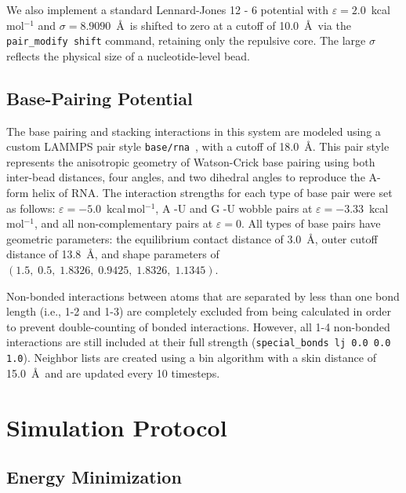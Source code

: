 We also implement a standard Lennard-Jones 12 - 6 potential
with $\varepsilon = 2.0$~kcal\,mol$^{-1}$ and $\sigma = 8.9090$~\AA\
is shifted to zero at a cutoff of 10.0~\AA\ via the
\texttt{pair\_modify shift} command, retaining only the repulsive core.
The large $\sigma$ reflects the physical size of a nucleotide-level bead.

\subsection{Base-Pairing Potential}

The base pairing and stacking interactions in this system are modeled using a custom LAMMPS pair style \texttt{base/rna}~\cite{Aierken2024}, with a cutoff of 18.0~\AA. This pair style represents the anisotropic geometry of Watson-Crick base pairing using both inter-bead distances, four angles, and two dihedral angles to reproduce the A-form helix of RNA. The interaction strengths for each type of base pair were set as follows:
$\varepsilon = -5.0$~kcal\,mol$^{-1}$, A -U and G -U wobble pairs at
$\varepsilon = -3.33$~kcal\,mol$^{-1}$, and all non-complementary pairs
at $\varepsilon = 0$.
All types of base pairs have geometric parameters: the equilibrium contact distance of
3.0~\AA, outer cutoff distance of 13.8~\AA, and shape parameters of
$(1.5,\;0.5,\;1.8326,\;0.9425,\;1.8326,\;1.1345)$.





Non-bonded interactions between atoms that are separated by less than one bond length (i.e., 1-2 and 1-3) are completely excluded from being calculated in order to prevent double-counting of bonded interactions. However, all 1-4 non-bonded interactions are still included at their full strength (\texttt{special\_bonds lj 0.0 0.0 1.0}). Neighbor lists are created using a bin algorithm with a skin distance of 15.0~\AA\ and are updated every 10 timesteps.




\section{Simulation Protocol}
\label{sec:sim_protocol}

\subsection{Energy Minimization}

